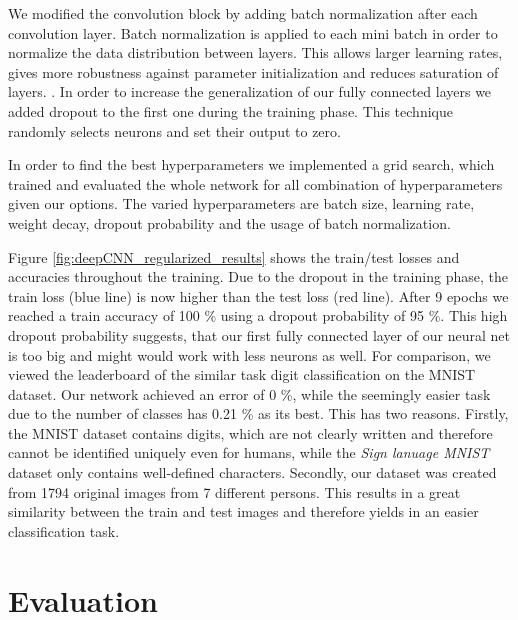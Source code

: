\documentclass[a4paper]{article}
\begin{document}
We modified the convolution block by adding batch normalization \cite{ioffe2015batch} after each convolution layer. Batch normalization is applied to each mini batch in order to normalize the data distribution between layers. This allows larger learning rates, gives more robustness against parameter initialization and reduces saturation of layers. \cite{ioffe2015batch}. In order to increase the generalization of our fully connected layers we added dropout to the first one during the training phase. This technique randomly selects neurons and set their output to zero. 

In order to find the best hyperparameters we implemented a grid search, which trained and evaluated the whole network for all  combination of hyperparameters given our options. The varied hyperparameters are batch size, learning rate, weight decay, dropout probability and the usage of batch normalization.

Figure \ref{fig:deepCNN_regularized_results} shows the train/test losses and accuracies throughout the training. Due to the dropout in the training phase, the train loss (blue line) is now higher than the test loss (red line). After 9 epochs we reached a train accuracy of 100 \% using a dropout probability of 95 \%. This high dropout probability suggests, that our first fully connected layer of our neural net is too big and might would work with less neurons as well. For comparison, we viewed the leaderboard of the similar task digit classification on the MNIST dataset. Our network achieved an error of 0 \%, while the seemingly easier task due to the number of classes has 0.21 \% as its best. This has two reasons. Firstly, the MNIST dataset contains digits, which are not clearly written and therefore cannot be identified uniquely even for humans, while the \textit{Sign lanuage MNIST} dataset only contains well-defined characters. Secondly, our dataset was created from 1794 original images from 7 different persons. This results in a great similarity between the train and test images and therefore yields in an easier classification task.

\section{Evaluation}
\label{ch:evaluation}
\end{document}
